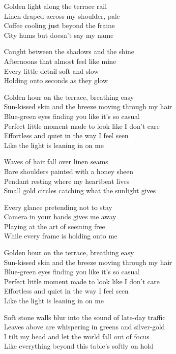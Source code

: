 \begin{lyrics}
Golden light along the terrace rail\\
Linen draped across my shoulder, pale\\
Coffee cooling just beyond the frame\\
City hums but doesn’t say my name

Caught between the shadows and the shine\\
Afternoons that almost feel like mine\\
Every little detail soft and slow\\
Holding onto seconds as they glow

Golden hour on the terrace, breathing easy\\
Sun-kissed skin and the breeze moving through my hair\\
Blue-green eyes finding you like it’s so casual\\
Perfect little moment made to look like I don’t care\\
Effortless and quiet in the way I feel seen\\
Like the light is leaning in on me

Waves of hair fall over linen seams\\
Bare shoulders painted with a honey sheen\\
Pendant resting where my heartbeat lives\\
Small gold circles catching what the sunlight gives

Every glance pretending not to stay\\
Camera in your hands gives me away\\
Playing at the art of seeming free\\
While every frame is holding onto me

Golden hour on the terrace, breathing easy\\
Sun-kissed skin and the breeze moving through my hair\\
Blue-green eyes finding you like it’s so casual\\
Perfect little moment made to look like I don’t care\\
Effortless and quiet in the way I feel seen\\
Like the light is leaning in on me

Soft stone walls blur into the sound of late-day traffic\\
Leaves above are whispering in greens and silver-gold\\
I tilt my head and let the world fall out of focus\\
Like everything beyond this table’s softly on hold


\end{lyrics}
